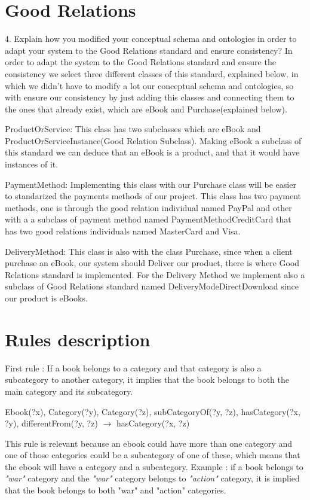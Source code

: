 \documentclass[a4paper,12pt]{article}
\begin{document}
\section{Good Relations}
4. Explain how you modified your conceptual schema and ontologies in order to adapt your system to the Good Relations standard and ensure consistency?
In order to adapt the system to the Good Relations standard and ensure the consistency we select three different classes of this standard, explained below. in which we didn’t have to modify a lot our conceptual schema and ontologies, so with ensure our consistency by just adding this classes and connecting them to the ones that already exist, which are eBook and Purchase(explained below).

ProductOrService: This class has two subclasses which are eBook and
ProductOrServiceInstance(Good Relation Subclass). Making eBook a subclass of this standard
we can deduce that an eBook is a product, and that it would have instances of it.

PaymentMethod: Implementing this class with our Purchase class will be easier to standarized
the payments methods of our project. This class has two payment methods, one is through the
good relation individual named PayPal and other with a a subclass of payment method named
PaymentMethodCreditCard that has two good relations individuals named MasterCard and Visa.

DeliveryMethod: This class is also with the class Purchase, since when a client purchase an
eBook, our system should Deliver our product, there is where Good Relations standard is
implemented. For the Delivery Method we implement also a subclass of Good Relations standard
named DeliveryModeDirectDownload since our product is eBooks.
\section{Rules description}
First rule : If a book belongs to a category and that category is also a subcategory to another
category, it implies that the book belongs to both the main category and its subcategory.

Ebook(?x), Category(?y), Category(?z), subCategoryOf(?y, ?z), hasCategory(?x, ?y), differentFrom(?y, ?z) $\rightarrow$ hasCategory(?x, ?z)

This rule is relevant because an ebook could have more than one category and one of those categories could
be a subcategory of one of these, which means that the ebook will have a category and a subcategory.
Example : if a book belongs to \textit{"war"} category and the \textit{"war"} category belongs to \textit{"action"} category,
it is implied that the book belongs to both "war" and "action" categories.\\
\end{document}
